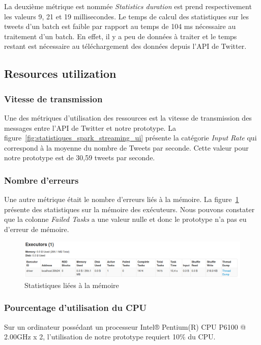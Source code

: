     La deuxième métrique est nommée \emph{Statistics duration} est prend respectivement les valeurs 9, 21 et 19 millisecondes. Le temps de calcul des statistiques sur les tweets d'un batch est faible par rapport au temps de 104 ms nécessaire au traitement d'un batch. En effet, il y a peu de données à traiter et le temps restant est nécessaire au téléchargement des données depuis l'API de Twitter.

  \subsection{Resources utilization}
    \subsubsection{Vitesse de transmission}
      Une des métriques d'utilisation des ressources est la vitesse de transmission des messages entre l'API de Twitter et notre prototype. La figure~\ref{fig:statistiques_spark_streaming_ui} présente la catégorie \emph{Input Rate} qui correspond à la moyenne du nombre de Tweets par seconde. Cette valeur pour notre prototype est de 30,59 tweets par seconde.

    \subsubsection{Nombre d'erreurs}
      Une autre métrique était le nombre d'erreurs liés à la mémoire. La figure~\ref{fig:executor_spark_streaming_ui} présente des statistiques sur la mémoire des exécuteurs. Nous pouvons constater que la colonne \emph{Failed Tasks} a une valeur nulle et donc le prototype n'a pas eu d'erreur de mémoire.

      \begin{figure}
        \centering
        \includegraphics[width=1.0\textwidth]{images/executor_spark_ui.png}
        \caption{Statistiques liées à la mémoire}
        \label{fig:executor_spark_streaming_ui}
      \end{figure}

    \subsubsection{Pourcentage d'utilisation du CPU}
      Sur un ordinateur possédant un processeur Intel® Pentium(R) CPU P6100 @ 2.00GHz x 2, l'utilisation de notre prototype requiert 10\% du CPU.


